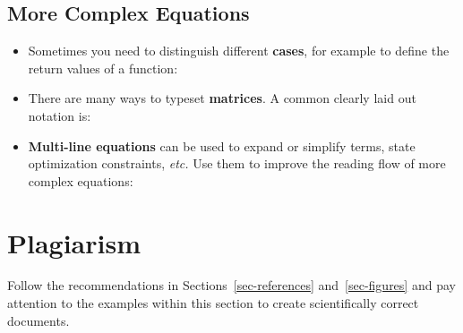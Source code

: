 \documentclass[11pt,a4paper]{article}
\begin{document}
\subsection{More Complex Equations}
\label{sec-math:examples}
\begin{itemize}
 \item Sometimes you need to distinguish different \textbf{cases}, for example to define the return values of a function:
 \vspace{-1em}
\begin{texexample}
  
  
\end{texexample}


\item There are many ways to typeset \textbf{matrices}. A common clearly laid out notation is:
\begin{texexample}
  
  
\end{texexample}

\item \textbf{Multi-line equations} can be used to expand or simplify terms, state optimization constraints, \emph{etc.}
Use them to improve the reading flow of more complex equations:
\vspace{-1em}
\begin{texexample}
  
  
\end{texexample}
\end{itemize}


\newpage
\section{Plagiarism}
\label{sec-plagiarism}
 Follow the recommendations in Sections~\ref{sec-references} and~\ref{sec-figures} and pay attention to the examples within this section to create scientifically correct documents.
\end{document}
